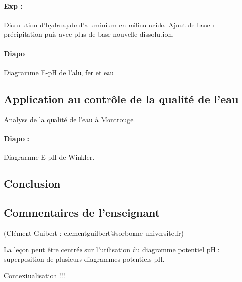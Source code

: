 \paragraph{Exp :} Dissolution d'hydroxyde d'aluminium en milieu acide. Ajout de base : précipitation puis avec plus de base nouvelle dissolution.

\paragraph{Diapo} Diagramme E-pH de l'alu, fer et eau

\subsection{Application au contrôle de la qualité de l'eau}

Analyse de la qualité de l'eau à Montrouge.

\paragraph{Diapo :} Diagramme E-pH de Winkler.

\subsection{Conclusion}

\subsection{Commentaires de l'enseignant}

(Clément Guibert : clementguilbert@sorbonne-universite.fr)

La leçon peut être centrée sur l'utilisation du diagramme potentiel pH : superposition de plusieurs diagrammes potentiels pH.

Contextualisation !!!
